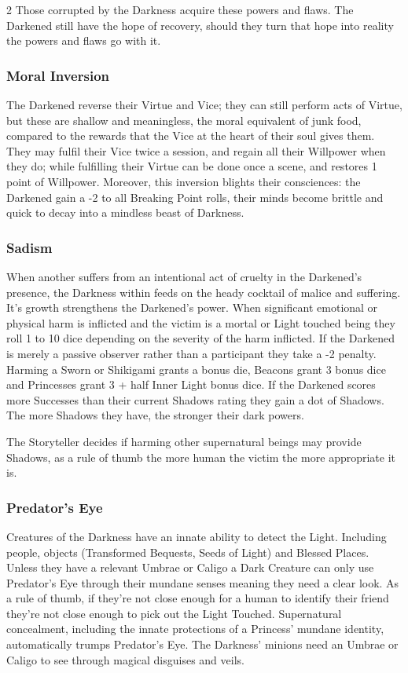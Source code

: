 \begin{multicols}{2}
Those corrupted by the Darkness acquire these powers and flaws. The Darkened still have the hope of recovery, should they turn that hope into reality the powers and flaws go with it. 

\subsubsection*{Moral Inversion}
The Darkened reverse their Virtue and Vice; they can still perform acts of Virtue, but these are shallow and meaningless, the moral equivalent of junk food, compared to the rewards that the Vice at the heart of their soul gives them. They may fulfil their Vice twice a session, and regain all their Willpower when they do; while fulfilling their Virtue can be done once a scene, and restores 1 point of Willpower. Moreover, this inversion blights their consciences: the Darkened gain a -2 to all Breaking Point rolls, their minds become brittle and quick to decay into a mindless beast of Darkness. 

\subsubsection*{Sadism}
When another suffers from an intentional act of cruelty in the Darkened's presence, the Darkness within feeds on the heady cocktail of malice and suffering. It's growth strengthens the Darkened's power. When significant emotional or physical harm is inflicted and the victim is a mortal or Light touched being they roll 1 to 10 dice depending on the severity of the harm inflicted. If the Darkened is merely a passive observer rather than a participant they take a -2 penalty. Harming a Sworn or Shikigami grants a bonus die, Beacons grant 3 bonus dice and Princesses grant 3 + half Inner Light bonus dice. If the Darkened scores more Successes than their current Shadows rating they gain a dot of Shadows. The more Shadows they have, the stronger their dark powers.  

The Storyteller decides if harming other supernatural beings may provide Shadows, as a rule of thumb the more human the victim the more appropriate it is. 

\subsubsection*{Predator's Eye}
Creatures of the Darkness have an innate ability to detect the Light. Including people, objects (Transformed Bequests, Seeds of Light) and Blessed Places. Unless they have a relevant Umbrae or Caligo a Dark Creature can only use Predator's Eye through their mundane senses meaning they need a clear look. As a rule of thumb, if they're not close enough for a human to identify their friend they're not close enough to pick out the Light Touched. Supernatural concealment, including the innate protections of a Princess' mundane identity, automatically trumps Predator's Eye. The Darkness' minions need an Umbrae or Caligo to see through magical disguises and veils.


\end{multicols}
